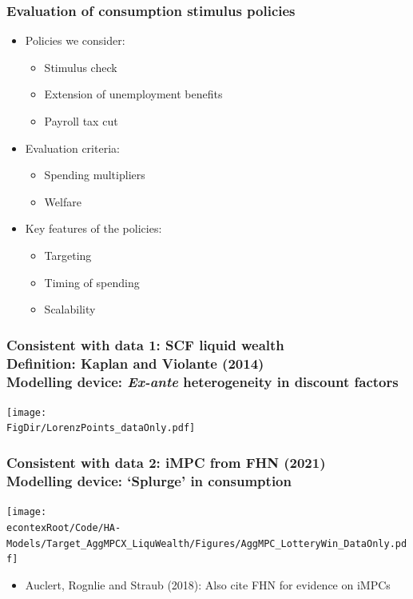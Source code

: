 \documentclass[pdflatex,aspectratio=169]{beamer}
\begin{document}
\begin{frame}
\frametitle{Evaluation of consumption stimulus policies}
\begin{itemize}
	\itemsep = .5\bigskipamount 
	\item Policies we consider: 
		\begin{itemize}
			\itemsep = .25\bigskipamount 
			\item Stimulus check 
			\item Extension of unemployment benefits 
			\item Payroll tax cut 
		\end{itemize}
	\item Evaluation criteria: 
		\begin{itemize}
		\itemsep = .25\bigskipamount 
		\item Spending multipliers 
		\item Welfare 
		\end{itemize}
	\item Key features of the policies: 
		\begin{itemize}
		\itemsep = .25\bigskipamount 
		\item Targeting 
		\item Timing of spending 
		\item Scalability 
		\end{itemize}
\end{itemize}
\end{frame}

\begin{frame}
	\frametitle{Consistent with data 1: SCF liquid wealth \\[1ex]
	\small Definition: Kaplan and Violante (2014) \\[-.5ex] 
	 Modelling device: \textit{Ex-ante} heterogeneity in discount factors \normalsize}
	\centering 
	\texttt{[image: \\FigDir/LorenzPoints\_dataOnly.pdf]}
\end{frame}

\begin{frame}
	\frametitle{Consistent with data 2: iMPC from FHN (2021) \\ 
	\small Modelling device: `Splurge' in consumption \normalsize}
	\centering
	\texttt{[image: \\econtexRoot/Code/HA-Models/Target\_AggMPCX\_LiquWealth/Figures/AggMPC\_LotteryWin\_DataOnly.pdf]}
	\begin{itemize}
	\itemsep = 0.5\bigskipamount
	\item Auclert, Rognlie and Straub (2018): Also cite FHN for evidence on iMPCs
	\end{itemize}
\end{frame}
\end{document}
